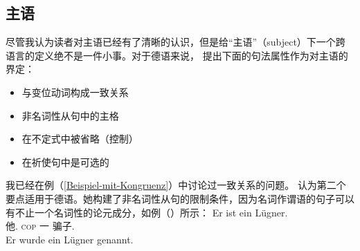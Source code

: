 \subsection{主语}
\label{Abschnitt-Subjekt}
尽管我认为读者对主语已经有了清晰的认识，但是给“主语”（subject）下一个跨语言的定义绝不是一件小事。对于德语来说， \citet{Reis82}提出下面的句法属性作为对主语的界定：
\begin{itemize}
\item 与变位动词构成一致关系
\item 非名词性从句中的主格
\item 在不定式中被省略（控制）
\item 在祈使句中是可选的
\end{itemize}
我已经在例（\ref{Beispiel-mit-Kongruenz}）中讨论过一致关系的问题。 \citet{Reis82}认为第二个要点适用于德语。她构建了非名词性从句的限制条件，因为名词作谓语的句子可以有不止一个名词性的论元成分，如例（）所示：
\eal
\ex
\gll Er ist ein Lügner.\\
     他.\nom{} \textsc{cop} 一 骗子.\nom{}\\
\ex 
\gll Er wurde ein Lügner genannt.\\
